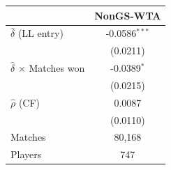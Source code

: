 \begin{tabular}{lc}
\toprule
 & NonGS-WTA \\
\midrule
$\hat{\delta}$ (LL entry) & -0.0586$^{***}$ \\
 & (0.0211) \\
$\hat{\delta}$ $\times$ Matches won & -0.0389$^{*}$ \\
 & (0.0215) \\
$\hat{\rho}$ (CF) & 0.0087 \\
 & (0.0110) \\
\midrule
Matches & 80,168 \\
Players & 747 \\
\bottomrule
\end{tabular}
